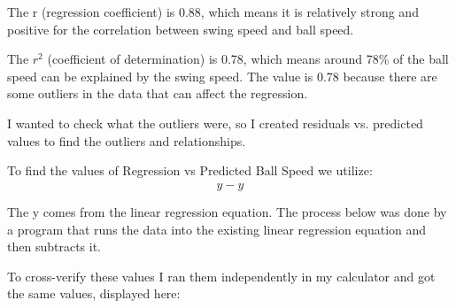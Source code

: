 \documentclass[12pt]{article}
\begin{document}
The r (regression coefficient) is 0.88, which means it is relatively strong and positive for the correlation between swing speed and ball speed.

The $r^2$ (coefficient of determination) is 0.78, which means around 78\% of the ball speed can be explained by the swing speed. The value is 0.78 because there are some outliers in the data that can affect the regression.

I wanted to check what the outliers were, so I created residuals vs. predicted values to find the outliers and relationships.


To find the values of Regression vs Predicted Ball Speed we utilize:
\[
y - \hat{y}
\]

The y comes from the linear regression equation.
The process below was done by a program that runs the data into the existing linear regression equation and then subtracts it. 

To cross-verify these values I ran them independently in my calculator and got the same values, displayed here:
\end{document}
